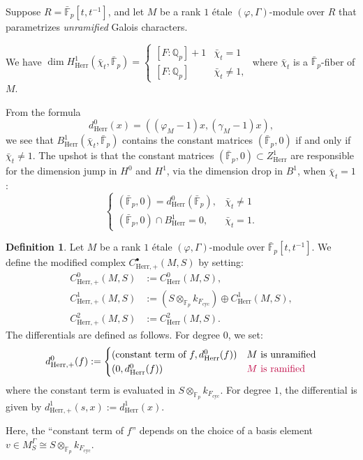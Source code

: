 \documentclass[11pt]{amsart}
\newcommand{\MINOREDITED}[1]{#1}
\theoremstyle{definition}
\newtheorem{defn}[thm]{Definition}
\newcommand{\EDIT}[1]{{\color{purple} #1}}
\newcommand{\Q}{\mathbb{Q}}
\newcommand{\F}{\mathbb{F}}
\newcommand{\bFp}{\bar{\mathbb{F}}_p}
\newcommand{\cyc}{{\operatorname{cyc}}}
\newcommand{\dF}{[F:\Q_p]}
\DeclareMathOperator{\un}{un}
\DeclareMathOperator{\Gal}{Gal}
\newcommand{\Herr}{\mathrm{Herr}}
\begin{document}
Suppose $R=\bFp[t,t^{-1}]$, and let
$M$ be a rank $1$ \'etale $(\varphi, \Gamma)$-module
over $R$ that parametrizes {\it unramified}
Galois characters.

We have $\dim H^1_{\Herr}(\bar\chi_t, \bFp)
=
\begin{cases}
\dF+1 & \bar\chi_t=1 \\
\dF & \bar\chi_t\neq 1,
\end{cases}
$
where $\bar\chi_t$ is
a $\bFp$-fiber of $M$.

From the formula
\[
d^0_\Herr(x) = ((\varphi_M-1)x, (\gamma_M-1)x),
\]
we see that
$B_{\Herr}^1(\bar\chi_t,\bFp)$
contains the constant matrices
$(\bFp,0)$
if and only if $\bar\chi_t\neq 1$.
The upshot is that
the constant matrices $(\bFp,0)\subset Z^1_{\Herr}$
are responsible for
the dimension jump in $H^0$ 
\MINOREDITED{and $H^1$, via the dimension drop in $B^1$,}
when $\bar\chi_t=1$:
\[
\begin{cases}
(\bFp,0) = d^0_\Herr(\bFp), & \bar\chi_t\neq 1 \\
(\bFp,0)\cap B^1_\Herr = 0, & \bar\chi_t= 1.
\end{cases}
\]

\begin{defn}
\label{def:extra-Herr}
\rm
Let $M$ be a rank $1$ \'etale $(\varphi, \Gamma)$-module over
$\bFp[t,t^{-1}]$. We define the modified complex $C^\bullet_{\Herr,+}(M,S)$ by setting:
\begin{align*}
C^0_{\Herr,+}(M,S) &:= C^0_\Herr(M,S), \\
C^1_{\Herr,+}(M,S) &:= (S \otimes_{\F_p} k_{F_{\cyc}}) \oplus C^1_\Herr(M,S), \\
C^2_{\Herr,+}(M,S) &:= C^2_\Herr(M,S).
\end{align*}
The differentials are defined as follows. For degree $0$, we set:
\[
d_{\Herr,+}^0(f) :=
\begin{cases}
(\text{constant term of } f, d^0_\Herr(f)) 
&
\text{$M$ is unramified}
\\
(0, d^0_\Herr(f))
&
\text{\EDIT{$M$ is ramified}}
\end{cases}
\]
where the constant term is evaluated in $S \otimes_{\F_p} k_{F_{\cyc}}$.
For degree $1$, the differential is given by $d^1_{\Herr,+}(s, x) := d^1_\Herr(x)$.

Here, the ``constant term of $f$''
depends on the choice of a basis element
$v\in M_S^{\Gamma}\cong S\otimes_{\MINOREDITED{\F_p}}k_{F_\cyc}$.
\end{defn}
\end{document}
